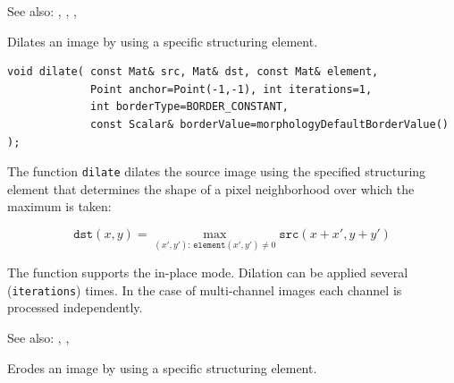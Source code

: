 See also: , , , 


\label{dilate}
Dilates an image by using a specific structuring element.

\begin{lstlisting}
void dilate( const Mat& src, Mat& dst, const Mat& element,
             Point anchor=Point(-1,-1), int iterations=1,
             int borderType=BORDER_CONSTANT,
             const Scalar& borderValue=morphologyDefaultBorderValue() );
\end{lstlisting}
\begin{description}
\end{description}

The function \texttt{dilate} dilates the source image using the specified structuring element that determines the shape of a pixel neighborhood over which the maximum is taken:

\[
\texttt{dst}(x,y) = \max_{(x',y'): \, \texttt{element}(x',y')\ne0}\texttt{src}(x+x',y+y')
\]

The function supports the in-place mode. Dilation can be applied several (\texttt{iterations}) times. In the case of multi-channel images each channel is processed independently.

See also: , , 

\label{erode}
Erodes an image by using a specific structuring element.

